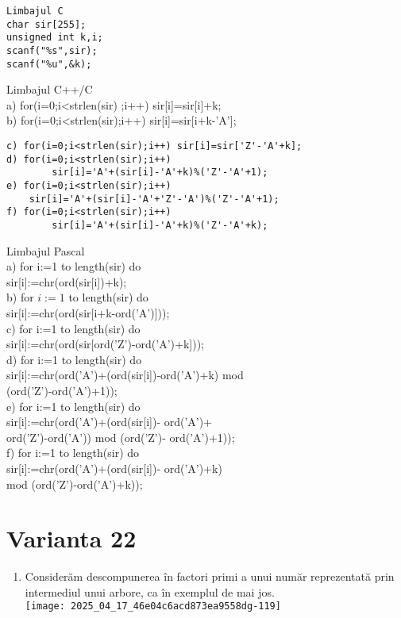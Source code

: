 \begin{verbatim}
Limbajul C
char sir[255];
unsigned int k,i;
scanf("%s",sir);
scanf("%u",&k);
\end{verbatim}

Limbajul C++/C\\[0pt]
a) for(i=0;i<strlen(sir) ;i++) sir[i]=sir[i]+k;\\[0pt]
b) for(i=0;i<strlen(sir);i++) sir[i]=sir[i+k-'A'];

\begin{verbatim}
c) for(i=0;i<strlen(sir);i++) sir[i]=sir['Z'-'A'+k];
d) for(i=0;i<strlen(sir);i++)
        sir[i]='A'+(sir[i]-'A'+k)%('Z'-'A'+1);
e) for(i=0;i<strlen(sir);i++)
    sir[i]='A'+(sir[i]-'A'+'Z'-'A')%('Z'-'A'+1);
f) for(i=0;i<strlen(sir);i++)
        sir[i]='A'+(sir[i]-'A'+k)%('Z'-'A'+k);
\end{verbatim}

Limbajul Pascal\\
a) for i:=1 to length(sir) do\\[0pt]
sir[i]:=chr(ord(sir[i])+k);\\
b) for $i:=1$ to length(sir) do\\[0pt]
sir[i]:=chr(ord(sir[i+k-ord('A')]));\\
c) for i:=1 to length(sir) do\\[0pt]
sir[i]:=chr(ord(sir[ord('Z')-ord('A')+k]));\\
d) for i:=1 to length(sir) do\\[0pt]
sir[i]:=chr(ord('A')+(ord(sir[i])-ord('A')+k) mod\\
(ord('Z')-ord('A')+1));\\
e) for i:=1 to length(sir) do\\[0pt]
sir[i]:=chr(ord('A')+(ord(sir[i])- ord('A')+\\
ord('Z')-ord('A')) mod (ord('Z')- ord('A')+1));\\
f) for i:=1 to length(sir) do\\[0pt]
sir[i]:=chr(ord('A')+(ord(sir[i])- ord('A')+k)\\
mod (ord('Z')-ord('A')+k));

\section*{Varianta 22}
\begin{enumerate}
  \item Considerăm descompunerea în factori primi a unui număr reprezentată prin intermediul unui arbore, ca în exemplul de mai jos.\\
\texttt{[image: 2025\_04\_17\_46e04c6acd873ea9558dg-119]}
\end{enumerate}

